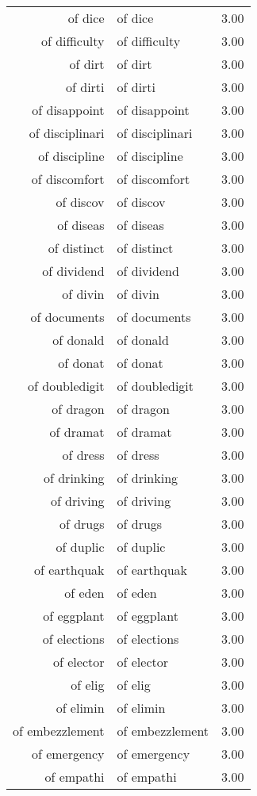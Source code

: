 \begin{table}[ht]
\begin{tabular}{rlr}
  of dice & of dice & 3.00 \\ 
  of difficulty & of difficulty & 3.00 \\ 
  of dirt & of dirt & 3.00 \\ 
  of dirti & of dirti & 3.00 \\ 
  of disappoint & of disappoint & 3.00 \\ 
  of disciplinari & of disciplinari & 3.00 \\ 
  of discipline & of discipline & 3.00 \\ 
  of discomfort & of discomfort & 3.00 \\ 
  of discov & of discov & 3.00 \\ 
  of diseas & of diseas & 3.00 \\ 
  of distinct & of distinct & 3.00 \\ 
  of dividend & of dividend & 3.00 \\ 
  of divin & of divin & 3.00 \\ 
  of documents & of documents & 3.00 \\ 
  of donald & of donald & 3.00 \\ 
  of donat & of donat & 3.00 \\ 
  of doubledigit & of doubledigit & 3.00 \\ 
  of dragon & of dragon & 3.00 \\ 
  of dramat & of dramat & 3.00 \\ 
  of dress & of dress & 3.00 \\ 
  of drinking & of drinking & 3.00 \\ 
  of driving & of driving & 3.00 \\ 
  of drugs & of drugs & 3.00 \\ 
  of duplic & of duplic & 3.00 \\ 
  of earthquak & of earthquak & 3.00 \\ 
  of eden & of eden & 3.00 \\ 
  of eggplant & of eggplant & 3.00 \\ 
  of elections & of elections & 3.00 \\ 
  of elector & of elector & 3.00 \\ 
  of elig & of elig & 3.00 \\ 
  of elimin & of elimin & 3.00 \\ 
  of embezzlement & of embezzlement & 3.00 \\ 
  of emergency & of emergency & 3.00 \\ 
  of empathi & of empathi & 3.00 \\ 

\end{tabular}
\end{table}
